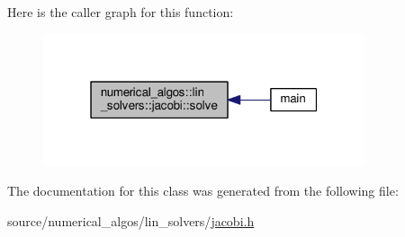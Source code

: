 Here is the caller graph for this function\-:\nopagebreak
\begin{figure}[H]
\begin{center}
\leavevmode
\includegraphics[width=268pt]{classnumerical__algos_1_1lin__solvers_1_1jacobi_aebc8f746eb9b5f412c6ea79a4149621f_icgraph}
\end{center}
\end{figure}




The documentation for this class was generated from the following file\-:\begin{DoxyCompactItemize}
\item 
source/numerical\-\_\-algos/lin\-\_\-solvers/\hyperlink{jacobi_8h}{jacobi.\-h}\end{DoxyCompactItemize}
